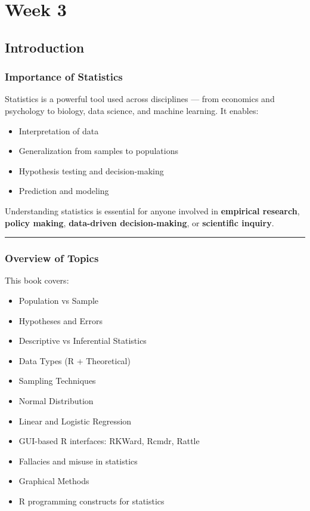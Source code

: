 \documentclass[
  letterpaper,
  DIV=11,
  numbers=noendperiod]{scrreprt}
\providecommand{\tightlist}{%
  \setlength{\itemsep}{0pt}\setlength{\parskip}{0pt}}
\begin{document}

\chapter{Week 3}\label{week-3}

\section{Introduction}\label{introduction-2}

\subsection{Importance of Statistics}\label{importance-of-statistics}

Statistics is a powerful tool used across disciplines --- from economics
and psychology to biology, data science, and machine learning. It
enables:

\begin{itemize}
\tightlist
\item
  Interpretation of data
\item
  Generalization from samples to populations
\item
  Hypothesis testing and decision-making
\item
  Prediction and modeling
\end{itemize}

Understanding statistics is essential for anyone involved in
\textbf{empirical research}, \textbf{policy making}, \textbf{data-driven
decision-making}, or \textbf{scientific inquiry}.

\begin{center}\rule{0.5\linewidth}{0.5pt}\end{center}

\subsection{Overview of Topics}\label{overview-of-topics}

This book covers:

\begin{itemize}
\tightlist
\item
  Population vs Sample
\item
  Hypotheses and Errors
\item
  Descriptive vs Inferential Statistics
\item
  Data Types (R + Theoretical)
\item
  Sampling Techniques
\item
  Normal Distribution
\item
  Linear and Logistic Regression
\item
  GUI-based R interfaces: RKWard, Rcmdr, Rattle
\item
  Fallacies and misuse in statistics
\item
  Graphical Methods
\item
  R programming constructs for statistics
\end{itemize}
\end{document}
